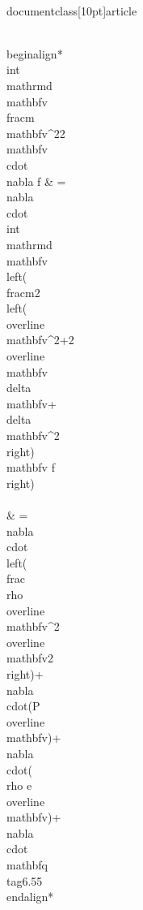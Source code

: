 \\documentclass[10pt]{article}
\begin{document}
{{{{\\begin{align*}
\\int \\mathrm{d} \\mathbf{v} \\frac{m \\mathbf{v}^{2}}{2} \\mathbf{v} \\cdot \\nabla f & =\\nabla \\cdot \\int \\mathrm{d} \\mathbf{v}\\left(\\frac{m}{2}\\left(\\overline{\\mathbf{v}}^{2}+2 \\overline{\\mathbf{v}} \\delta \\mathbf{v}+\\delta \\mathbf{v}^{2}\\right) \\mathbf{v} f\\right) \\\\
& =\\nabla \\cdot\\left(\\frac{\\rho \\overline{\\mathbf{v}}^{2} \\overline{\\mathbf{v}}}{2}\\right)+\\nabla \\cdot(P \\overline{\\mathbf{v}})+\\nabla \\cdot(\\rho e \\overline{\\mathbf{v}})+\\nabla \\cdot \\mathbf{q} \\tag{6.55}
\\end{align*}


}}}}
\end{document}
